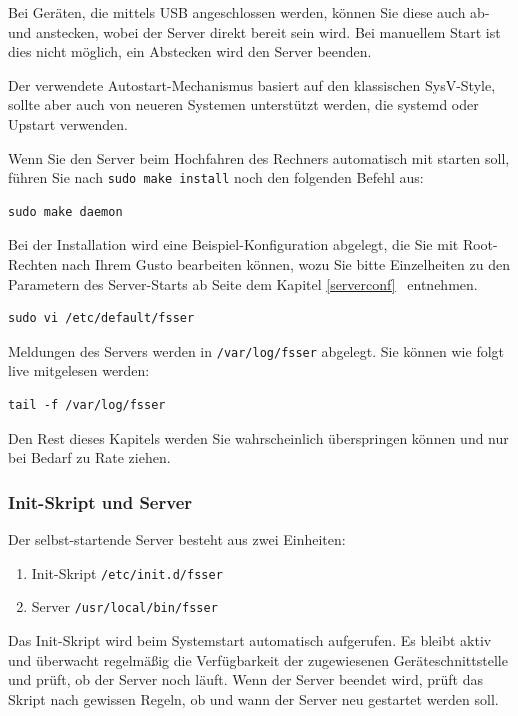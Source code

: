 \documentclass[10pt,a4paper]{scrartcl}		%
\begin{document}
Bei Geräten, die mittels USB angeschlossen werden,
können Sie diese auch ab- und anstecken, wobei der Server direkt bereit sein
wird. Bei manuellem Start ist dies nicht möglich, ein Abstecken wird den
Server beenden.

Der verwendete Autostart-Mechanismus basiert auf den klassischen SysV-Style,
sollte aber auch von neueren Systemen unterstützt werden, die systemd oder
Upstart verwenden.

Wenn Sie den Server beim Hochfahren des Rechners automatisch mit starten
soll, führen Sie nach \texttt{sudo make install} noch den folgenden Befehl aus:

\begin{verbatim}
sudo make daemon
\end{verbatim}

Bei der Installation wird eine Beispiel-Konfiguration abgelegt, die Sie
mit Root-Rechten nach Ihrem Gusto bearbeiten können, wozu Sie bitte
Einzelheiten zu den Parametern des Server-Starts ab Seite \pageref{serverconf}
dem Kapitel \glqq\ref{serverconf} \grqq\
entnehmen.


\begin{verbatim}
sudo vi /etc/default/fsser
\end{verbatim}

Meldungen des Servers werden in \texttt{/var/log/fsser}
abgelegt. Sie können wie folgt live mitgelesen werden:

\begin{verbatim}
tail -f /var/log/fsser
\end{verbatim}

Den Rest dieses Kapitels werden Sie wahrscheinlich überspringen können
und nur bei Bedarf zu Rate ziehen.

\subsubsection*{Init-Skript und Server}
Der selbst-startende Server besteht aus zwei Einheiten:
\begin{enumerate}
\item Init-Skript \texttt{/etc/init.d/fsser}
\item Server \texttt{/usr/local/bin/fsser}
\end{enumerate}

Das Init-Skript wird beim Systemstart automatisch aufgerufen. Es bleibt
aktiv und überwacht regelmäßig die Verfügbarkeit der zugewiesenen
Geräteschnittstelle und prüft, ob der Server noch läuft. Wenn der Server
beendet wird, prüft das Skript nach gewissen Regeln, ob und wann der
Server neu gestartet werden soll.
\end{document}
